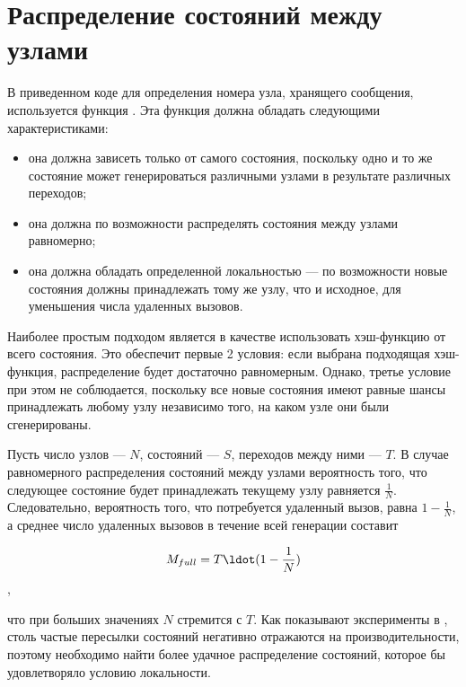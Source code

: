 \section{Распределение состояний между узлами}
\label{sec:state-partition}

В приведенном коде для определения номера узла, хранящего сообщения,
используется функция . Эта функция должна обладать следующими
характеристиками:

\begin{itemize}
\item она должна зависеть только от самого состояния, поскольку одно и
  то же состояние может генерироваться различными узлами в результате
  различных переходов;

\item она должна по возможности распределять состояния между узлами
  равномерно;

\item она должна обладать определенной локальностью — по возможности
  новые состояния должны принадлежать тому же узлу, что и исходное,
  для уменьшения числа удаленных вызовов.
\end{itemize}

Наиболее простым подходом является в качестве  использовать
хэш-функцию от всего состояния. Это обеспечит первые 2 условия: если
выбрана подходящая хэш-функция, распределение будет достаточно
равномерным. Однако, третье условие при этом не соблюдается, поскольку
все новые состояния имеют равные шансы принадлежать любому узлу
независимо того, на каком узле они были сгенерированы.

Пусть число узлов — $N$, состояний — $S$, переходов между ними —
$T$. В случае равномерного распределения состояний между узлами
вероятность того, что следующее состояние будет принадлежать текущему
узлу равняется $\frac{1}{N}$. Следовательно, вероятность того, что
потребуется удаленный вызов, равна $1 - \frac{1}{N}$, а среднее число
удаленных вызовов в течение всей генерации составит

\begin{equation}
  \label{eq:nmsg-full-hash}
  M_{full} = T \ldot (1 - \frac{1}{N})
\end{equation},

что при больших значениях $N$ стремится с $T$. Как
показывают эксперименты в \cite{LT99}, столь частые пересылки
состояний негативно отражаются на производительности, поэтому
необходимо найти более удачное распределение состояний, которое бы
удовлетворяло условию локальности.

